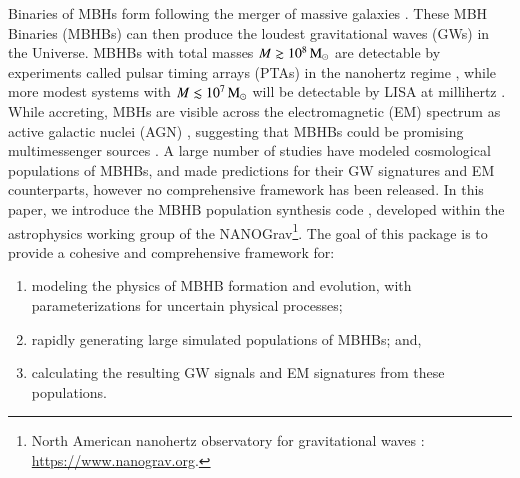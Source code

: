 \documentclass[useAMS, usenatbib]{src/mnras}
\begin{document}
    Binaries of MBHs form following the merger of massive galaxies \needcite{}.  These MBH Binaries (MBHBs) can then produce the loudest gravitational waves (GWs) in the Universe.  MBHBs with total masses $M \gtrsim 10^8 \,\textrm{M}_{\odot}$ are detectable by experiments called pulsar timing arrays (PTAs)  in the nanohertz regime \needcite{}, while more modest systems with $M \lesssim 10^7 \, \textrm{M}_{\odot}$ will be detectable by LISA  at millihertz \needcite{}.  While accreting, MBHs are visible across the electromagnetic (EM) spectrum as active galactic nuclei (AGN) \needcite{}, suggesting that MBHBs could be promising multimessenger sources \needcite{}.  A large number of studies have modeled cosmological populations of MBHBs, and made predictions for their GW signatures and EM counterparts, however no comprehensive framework has been released.  In this paper, we introduce the MBHB population synthesis code \holodeck{}, developed within the astrophysics working group of the NANOGrav\footnote{North American nanohertz observatory for gravitational waves \citep{}: \url{https://www.nanograv.org}.}.  The goal of this package is to provide a cohesive and comprehensive framework for:
    \begin{enumerate}
        \item
        modeling the physics of MBHB formation and evolution, with parameterizations for uncertain physical processes;
        \item
        rapidly generating large simulated populations of MBHBs; and,
        \item
        calculating the resulting GW signals and EM signatures from these populations.
    \end{enumerate}
\end{document}
